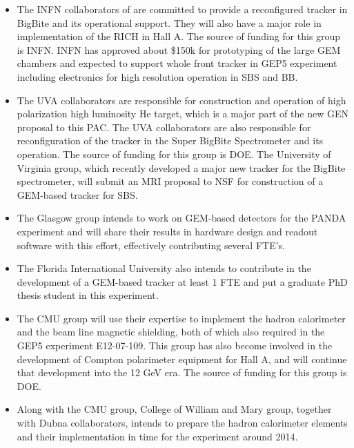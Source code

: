 \documentclass[12pt,letterpaper,oneside]{article}
\begin{document}
\begin{itemize}
\item 
The INFN collaborators of are committed 
to provide a reconfigured tracker in BigBite and its operational support. 
They will also have a major role in implementation of the RICH 
in Hall A.  The source of funding for this group is INFN.
INFN has approved about \$150k for prototyping of the large GEM chambers
and expected to support whole front tracker in GEP5 experiment including
electronics for high resolution operation in SBS and BB.

\item 
The UVA collaborators are responsible for construction and operation
of high polarization high luminosity He target, which is a major part
of the new GEN proposal to this PAC.
The UVA collaborators are also responsible for reconfiguration of the tracker
in the Super BigBite Spectrometer and its operation. 
The source of funding for this group is DOE.
The University of Virginia group, which recently developed a major new tracker
for the BigBite spectrometer, will  submit an MRI proposal to NSF 
for construction of a GEM-based tracker for SBS. 


\item 
The Glasgow group intends to work on GEM-based detectors for the 
PANDA experiment and will share their results in hardware design and readout 
software with this effort, effectively contributing several FTE's.

\item 
The Florida International University also intends to contribute in
the development of a GEM-based tracker at least 1 FTE and put
a graduate PhD thesis student in this experiment.

\item 
The CMU group
will use their expertise  to implement the hadron calorimeter
and the beam line magnetic shielding, both of which also required in
the GEP5 experiment E12-07-109. 
This group has also become involved in the development of Compton
polarimeter equipment for Hall A, and will continue that development
into the 12 GeV era.
The source of funding for this group is DOE.

\item 
Along with the CMU group, College of William and Mary group, together with Dubna collaborators, 
intends to prepare the hadron calorimeter elements and their 
implementation in time for the experiment around 2014. 

\end{itemize}
\end{document}

